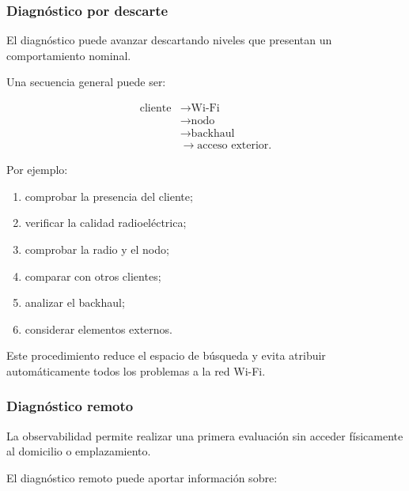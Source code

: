 \subsubsection*{Diagnóstico por descarte}

El diagnóstico puede avanzar descartando niveles que presentan un
comportamiento nominal.

Una secuencia general puede ser:

\[
\begin{aligned}
    \text{cliente}
    &\longrightarrow
    \text{Wi-Fi}\\
    &\longrightarrow
    \text{nodo}\\
    &\longrightarrow
    \text{backhaul}\\
    &\longrightarrow
    \text{acceso exterior}.
\end{aligned}
\]

Por ejemplo:

\begin{enumerate}
    \item comprobar la presencia del cliente;

    \item verificar la calidad radioeléctrica;

    \item comprobar la radio y el nodo;

    \item comparar con otros clientes;

    \item analizar el backhaul;

    \item considerar elementos externos.
\end{enumerate}

Este procedimiento reduce el espacio de búsqueda y evita atribuir
automáticamente todos los problemas a la red Wi-Fi.


\subsubsection*{Diagnóstico remoto}

La observabilidad permite realizar una primera evaluación sin acceder
físicamente al domicilio o emplazamiento.

El diagnóstico remoto puede aportar información sobre:

